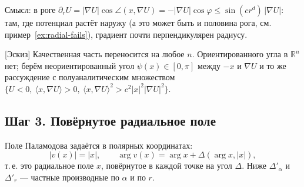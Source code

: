 \documentclass[11pt,a4paper]{article}
\theoremstyle{definition}
\newcommand{\R}{\mathbb R}
\newcommand{\mk}[1]{\textsf{[#1]}}
\begin{document}
Смысл: в роге $\partial_rU=|\nabla U|\cos\angle(x,\nabla U)=-|\nabla U|\cos\varphi\le\sin(cr^d)\,|\nabla U|$:
там, где потенциал растёт наружу (а это может быть и половина рога, см. пример~\ref{ex:radial-fails}),
градиент почти перпендикулярен радиусу.

\mk{Эскиз} Качественная часть переносится на любое $n$. Ориентированного угла в $\R^n$ нет; берём
неориентированный угол $\psi(x)\in[0,\pi]$ между $-x$ и $\nabla U$ и то же рассуждение с полуаналитическим
множеством $\{U<0,\ \langle x,\nabla U\rangle>0,\ \langle x,\nabla U\rangle^2>c^2|x|^2|\nabla U|^2\}$.

\subsection{Шаг 3. Повёрнутое радиальное поле}

Поле Паламодова задаётся в полярных координатах:
\begin{equation}\label{eq:Pfield}
|v(x)|=|x|,\qquad \arg v(x)=\arg x+\Delta(\arg x,|x|),
\end{equation}
т.\,е. это радиальное поле $x$, повёрнутое в каждой точке на угол $\Delta$. Ниже $\Delta'_\alpha$ и
$\Delta'_r$ --- частные производные по $\alpha$ и по $r$.
\end{document}
